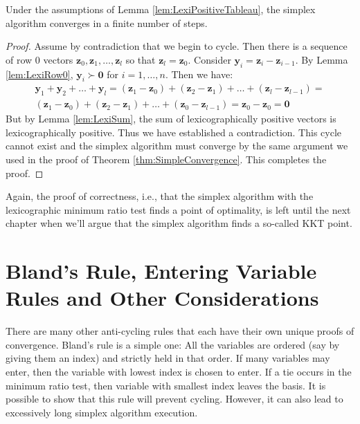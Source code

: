 \begin{theorem} Under the assumptions of Lemma \ref{lem:LexiPositiveTableau}, the simplex algorithm converges in a finite number of steps. 
\label{thm:SimplexConverge}
\end{theorem}
\begin{proof} Assume by contradiction that we begin to cycle. Then there is a sequence of row 0 vectors $\mathbf{z}_0, \mathbf{z}_1,\dots, \mathbf{z}_l$ so that $\mathbf{z}_l = \mathbf{z}_0$. Consider $\mathbf{y}_i = \mathbf{z}_i - \mathbf{z}_{i-1}$. By Lemma \ref{lem:LexiRow0}, $\mathbf{y}_i \succ \mathbf{0}$ for $i=1,\dots,n$. Then we have:
\begin{multline}
\mathbf{y}_1 + \mathbf{y}_2 + \dots + \mathbf{y}_l = (\mathbf{z}_1 - \mathbf{z}_0) + (\mathbf{z}_2 - \mathbf{z}_1) + \dots + (\mathbf{z}_l - \mathbf{z}_{l-1}) = \\
(\mathbf{z}_1 - \mathbf{z}_0) + (\mathbf{z}_2 - \mathbf{z}_1) + \dots + (\mathbf{z}_0 - \mathbf{z}_{l-1}) = \mathbf{z}_0 - \mathbf{z}_0 = \mathbf{0}
\end{multline}
But by Lemma \ref{lem:LexiSum}, the sum of lexicographically positive vectors is lexicographically positive. Thus we have established a contradiction. This cycle cannot exist and the simplex algorithm must converge by the same argument we used in the proof of Theorem \ref{thm:SimpleConvergence}. This completes the proof.
\end{proof}

\begin{remark} Again, the proof of correctness, i.e., that the simplex algorithm with the lexicographic minimum ratio test finds a point of optimality, is left until the next chapter when we'll argue that the simplex algorithm finds a so-called KKT point.
\end{remark}


\section{Bland's Rule, Entering Variable Rules and Other Considerations}
There are many other anti-cycling rules that each have their own unique proofs of convergence. Bland's rule is a simple one: All the variables are ordered (say by giving them an index) and strictly held in that order. If many variables may enter, then the variable with lowest index is chosen to enter. If a tie occurs in the minimum ratio test, then variable with smallest index leaves the basis. It is possible to show that this rule will prevent cycling. However, it can also lead to excessively long simplex algorithm execution. 

